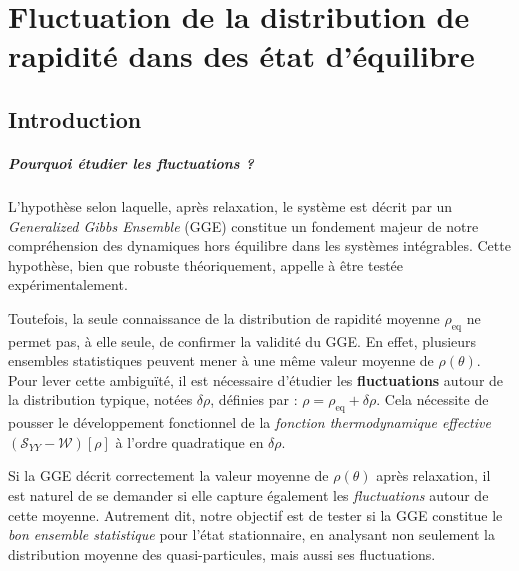 \chapter{Fluctuation de la distribution de rapidité dans des état d'équilibre}
\label{chap:Fluctu} 
\minitoc

\section*{Introduction}

\paragraph{Pourquoi étudier les fluctuations ?}

L’hypothèse selon laquelle, après relaxation, le système est décrit par un \textit{Generalized Gibbs Ensemble} (GGE) constitue un fondement majeur de notre compréhension des dynamiques hors équilibre dans les systèmes intégrables. Cette hypothèse, bien que robuste théoriquement, appelle à être testée expérimentalement.

Toutefois, la seule connaissance de la distribution de rapidité moyenne \( \rho_{\mathrm{eq}} \) ne permet pas, à elle seule, de confirmer la validité du GGE. En effet, plusieurs ensembles statistiques peuvent mener à une même valeur moyenne de \( \rho(\theta) \). Pour lever cette ambiguïté, il est nécessaire d’étudier les \textbf{fluctuations} autour de la distribution typique, notées \( \delta \rho \), définies par :
\(
\rho = \rho_{\mathrm{eq}} + \delta \rho.
\)
Cela nécessite de pousser le développement fonctionnel de la \emph{fonction thermodynamique effective} \( (\mathcal{S}_{YY} - \mathcal{W})[\rho] \) à l’ordre quadratique en \( \delta \rho \).

\medskip
Si la GGE décrit correctement la valeur moyenne de \( \rho(\theta) \) après relaxation, il est naturel de se demander si elle capture également les \emph{fluctuations} autour de cette moyenne. Autrement dit, notre objectif est de tester si la GGE constitue le \textit{bon ensemble statistique} pour l’état stationnaire, en analysant non seulement la distribution moyenne des quasi-particules, mais aussi ses fluctuations.\\


